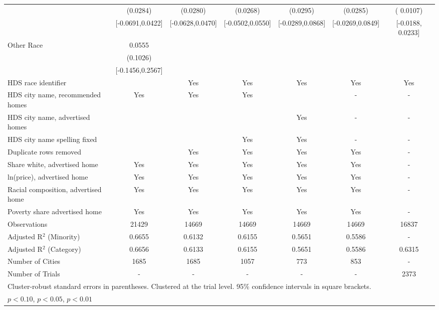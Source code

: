 \begin{table}[htbp]
{\begin{tabular}{l*{6}{c}}
 & (0.0284) & (0.0280) & (0.0268) & (0.0295) & (0.0285) & ( 0.0107) \\
 & [-0.0691,0.0422] & [-0.0628,0.0470] & [-0.0502,0.0550] & [-0.0289,0.0868] & [-0.0269,0.0849] & [-0.0188,  0.0233] \\
Other Race & 0.0555 &  &  &  &  &  \\
 & (0.1026) &  &  &  &  &  \\
 & [-0.1456,0.2567] &  &  &  &  &  \\
\midrule
HDS race identifier & & Yes & Yes & Yes & Yes & Yes \\
HDS city name, recommended homes & Yes & Yes & Yes & & - & -\\
HDS city name, advertised homes &  &  &  & Yes & - & -\\
HDS city name spelling fixed & & & Yes & Yes & - & -\\
Duplicate rows removed &  & Yes & Yes & Yes & Yes & - \\
\midrule
Share white, advertised home  & Yes & Yes & Yes & Yes & Yes & - \\
ln(price), advertised home  & Yes & Yes & Yes & Yes & Yes & - \\
Racial composition, advertised home & Yes & Yes & Yes & Yes & Yes & - \\
Poverty share advertised home & Yes & Yes & Yes & Yes & Yes & - \\
Observations & 21429 & 14669 & 14669 & 14669 & 14669 & 16837 \\
Adjusted R$^2$ (Minority) & 0.6655 & 0.6132 & 0.6155 & 0.5651 & 0.5586 & - \\
Adjusted R$^2$ (Category) & 0.6656 & 0.6133 & 0.6155 & 0.5651 & 0.5586 & 0.6315 \\
Number of Cities & 1685 & 1685 & 1057 & 773 & 853 & - \\
Number of Trials & - & - & - & - & - & 2373 \\
\bottomrule
\multicolumn{7}{l}{\footnotesize Cluster-robust standard errors in parentheses. Clustered at the trial level. 95\% confidence intervals in square brackets.}\\
\multicolumn{7}{l}{\footnotesize \sym{*} \(p<0.10\), \sym{**} \(p<0.05\), \sym{***} \(p<0.01\)}\\
\end{tabular}
}
\end{table}
